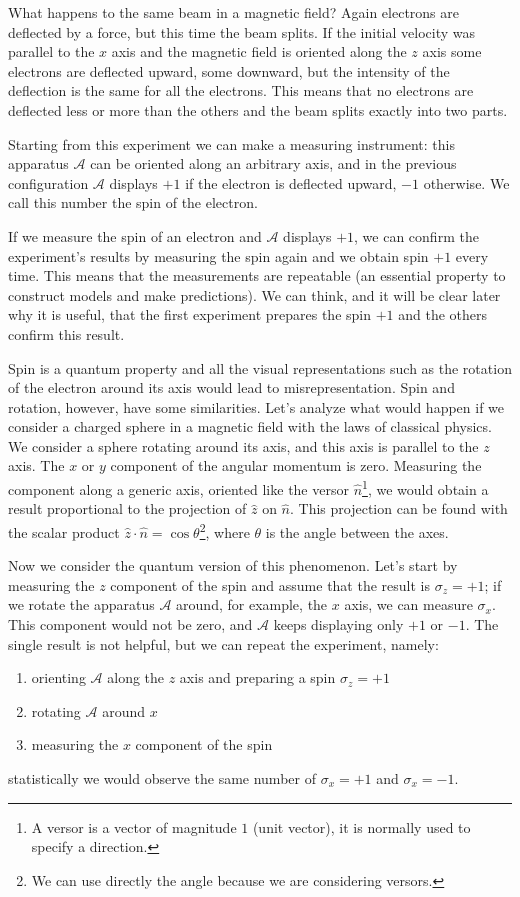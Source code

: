 What happens to the same beam in a magnetic field? Again electrons are deflected by a force, but this time the beam splits. If the initial velocity was parallel to the $x$ axis and the magnetic field is oriented along the $z$ axis some electrons are deflected upward, some downward, but the intensity of the deflection is the same for all the electrons. This means that no electrons are deflected less or more than the others and the beam splits exactly into two parts.

Starting from this experiment we can make a measuring instrument: this apparatus $\mathcal{A}$ can be oriented along an arbitrary axis, and in the previous configuration $\mathcal{A}$ displays $+1$ if the electron is deflected upward, $-1$ otherwise. We call this number the spin of the electron.

If  we measure the spin of an electron and $\mathcal{A}$ displays $+1$, we can confirm the experiment's results by measuring the spin again and we obtain spin $+1$ every time. This means that the measurements are repeatable (an essential property to construct models and make predictions). We can think, and it will be clear later why it is useful, that the first experiment prepares the spin $+1$ and the others confirm this result.

Spin is a quantum property and all the visual representations such as the rotation of the electron around its axis would lead to misrepresentation. Spin and rotation, however, have some similarities. Let's analyze what would happen if we consider a charged sphere in a magnetic field with the laws of classical physics. We consider a sphere rotating around its axis, and this axis is parallel to the $z$ axis. The $x$ or $y$ component of the angular momentum is zero. Measuring the component along a generic axis, oriented like the versor $\hat{n}$\footnote{A versor is a vector of magnitude $1$ (unit vector), it is normally used to specify a direction.}, we would obtain a result proportional to the projection of $\hat{z}$ on $\hat{n}$. This projection can be found with the scalar product $\hat{z}\cdot\hat{n} = \cos{\theta}$\footnote{We can use directly the angle because we are considering versors.}, where $\theta$ is the angle between the axes.

Now we consider the quantum version of this phenomenon. Let’s start by measuring the $z$ component of the spin and assume that the result is $\sigma_z = +1$; if we rotate the apparatus $\mathcal{A}$ around, for example, the $x$ axis, we can measure $\sigma_x$. This component would not be zero, and $\mathcal{A}$ keeps displaying only $+1$ or $-1$. The single result is not helpful, but we can repeat the experiment, namely:
\begin{enumerate}
	\item orienting $\mathcal{A}$ along the $z$ axis and preparing a spin $\sigma_z = +1$
	\item rotating $\mathcal{A}$ around $x$
	\item measuring the $x$ component of the spin
\end{enumerate}
statistically we would observe the same number of $\sigma_x = +1$ and $\sigma_x = -1$.

